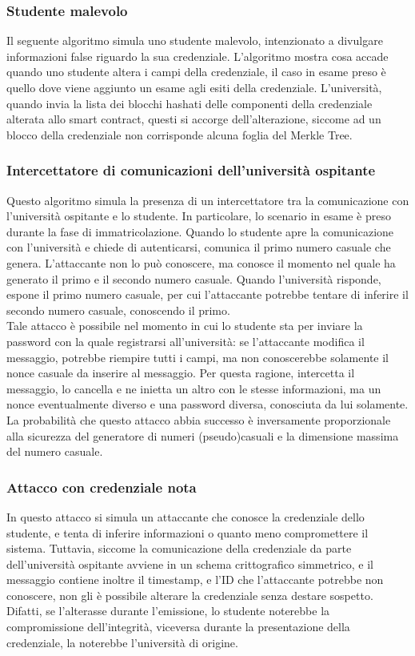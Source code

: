 \documentclass[a4paper,12pt]{article}
\begin{document}
\subsubsection{Studente malevolo}
Il seguente algoritmo simula uno studente malevolo, intenzionato a divulgare informazioni false riguardo la sua credenziale. L'algoritmo mostra cosa accade quando uno studente altera i campi della credenziale, il caso in esame preso è quello dove viene aggiunto un esame agli esiti della credenziale. L'università, quando invia la lista dei blocchi hashati delle componenti della credenziale alterata allo smart contract, questi si accorge dell'alterazione, siccome ad un blocco della credenziale non corrisponde alcuna foglia del Merkle Tree.
\subsubsection{Intercettatore di comunicazioni dell'università ospitante}
Questo algoritmo simula la presenza di un intercettatore tra la comunicazione con l'università ospitante e lo studente. In particolare, lo scenario in esame è preso durante la fase di immatricolazione. Quando lo studente apre la comunicazione con l'università e chiede di autenticarsi, comunica il primo numero casuale che genera. L'attaccante non lo può conoscere, ma conosce il momento nel quale ha generato il primo e il secondo numero casuale. Quando l'università risponde, espone il primo numero casuale, per cui l'attaccante potrebbe tentare di inferire il secondo numero casuale, conoscendo il primo.
\\[1em]
Tale attacco è possibile nel momento in cui lo studente sta per inviare la password con la quale registrarsi all'università: se l'attaccante modifica il messaggio, potrebbe riempire tutti i campi, ma non conoscerebbe solamente il nonce casuale da inserire al messaggio. Per questa ragione, intercetta il messaggio, lo cancella e ne inietta un altro con le stesse informazioni, ma un nonce eventualmente diverso e una password diversa, conosciuta da lui solamente. La probabilità che questo attacco abbia successo è inversamente proporzionale alla sicurezza del generatore di numeri (pseudo)casuali e la dimensione massima del numero casuale.
\subsubsection{Attacco con credenziale nota}
In questo attacco si simula un attaccante che conosce la credenziale dello studente, e tenta di inferire informazioni o quanto meno compromettere il sistema. Tuttavia, siccome la comunicazione della credenziale da parte dell'università ospitante avviene in un schema crittografico simmetrico, e il messaggio contiene inoltre il timestamp, e l'ID che l'attaccante potrebbe non conoscere, non gli è possibile alterare la credenziale senza destare sospetto. Difatti, se l'alterasse durante l'emissione, lo studente noterebbe la compromissione dell'integrità, viceversa durante la presentazione della credenziale, la noterebbe l'università di origine.
\end{document}
